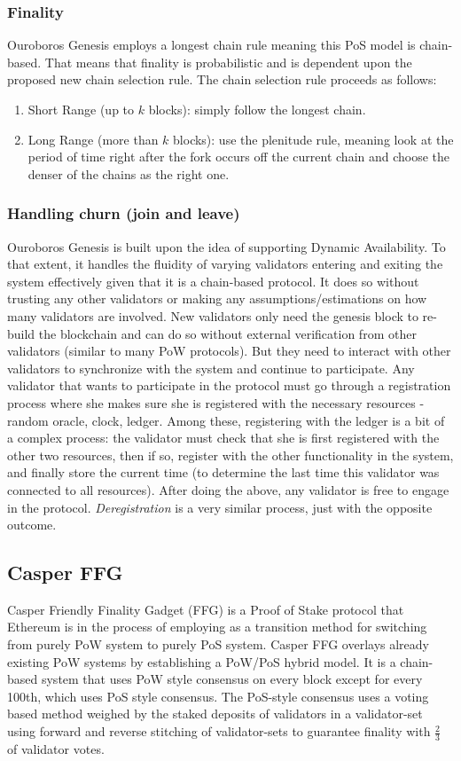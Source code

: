 \documentclass[10pt,journal,compsoc]{IEEEtran}
\begin{document}
\subsubsection{Finality}
Ouroboros Genesis employs a longest chain rule meaning this PoS model is chain-based. That means that finality is probabilistic and is dependent upon the proposed new chain selection rule. The chain selection rule proceeds as follows: 
\begin{enumerate}
    \item Short Range (up to $k$ blocks): simply follow the longest chain.
    \item Long Range (more than $k$ blocks): use the plenitude rule, meaning look at the period of time right after the fork occurs off the current chain and choose the denser of the chains as the right one.
\end{enumerate}

\subsubsection{Handling churn (join and leave)}
Ouroboros Genesis is built upon the idea of supporting Dynamic Availability. To that extent, it handles the fluidity of varying validators entering and exiting the system effectively given that it is a chain-based protocol. It does so without trusting any other validators or making any assumptions/estimations on how many validators are involved. New validators only need the genesis block to re-build the blockchain and can do so without external verification from other validators (similar to many PoW protocols). But they need to interact with other validators to synchronize with the system and continue to participate. Any validator that wants to participate in the protocol must go through a registration process where she makes sure she is registered with the necessary resources - random oracle, clock, ledger. Among these, registering with the ledger is a bit of a complex process: the validator must check that she is first registered with the other two resources, then if so, register with the other functionality in the system, and finally store the current time (to determine the last time this validator was connected to all resources). After doing the above, any validator is free to engage in the protocol. \emph{Deregistration} is a very similar process, just with the opposite outcome.

\subsection{Casper FFG}
Casper Friendly Finality Gadget (FFG) \cite{FFG} is a Proof of Stake protocol that Ethereum is in the process of employing as a transition method for switching from purely PoW system to purely PoS system. Casper FFG overlays already existing PoW systems by establishing a PoW/PoS hybrid model. It is a chain-based system that uses PoW style consensus on every block except for every 100th, which uses PoS style consensus. The PoS-style consensus uses a voting based method weighed by the staked deposits of validators in a validator-set using forward and reverse stitching of validator-sets to guarantee finality with \(\frac{2}{3}\) of validator votes.
\end{document}
